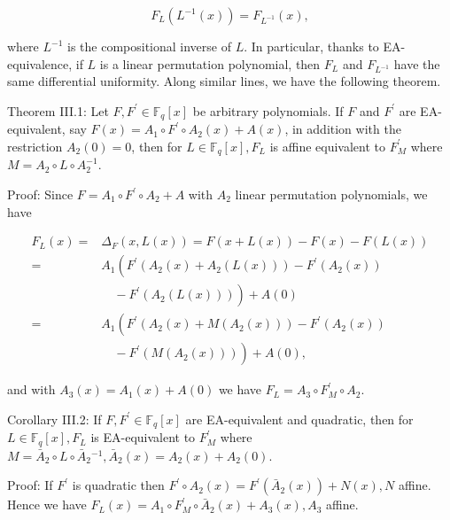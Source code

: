 \documentclass[10pt]{article}
\begin{document}
\begin{equation*}
F_{L}\left(L^{-1}(x)\right)=F_{L^{-1}}(x), \tag{3}
\end{equation*}


where $L^{-1}$ is the compositional inverse of $L$. In particular, thanks to EA-equivalence, if $L$ is a linear permutation polynomial, then $F_{L}$ and $F_{L^{-1}}$ have the same differential uniformity. Along similar lines, we have the following theorem.

Theorem III.1: Let $F, F^{\prime} \in \mathbb{F}_{q}[x]$ be arbitrary polynomials. If $F$ and $F^{\prime}$ are EA-equivalent, say $F(x)=A_{1} \circ F^{\prime} \circ A_{2}(x)+ A(x)$, in addition with the restriction $A_{2}(0)=0$, then for $L \in \mathbb{F}_{q}[x], F_{L}$ is affine equivalent to $F_{M}^{\prime}$ where $M=A_{2} \circ L \circ A_{2}^{-1}$.

Proof: Since $F=A_{1} \circ F^{\prime} \circ A_{2}+A$ with $A_{2}$ linear permutation polynomials, we have

$$
\begin{aligned}
F_{L}(x)= & \Delta_{F}(x, L(x))=F(x+L(x))-F(x)-F(L(x)) \\
= & A_{1}\left(F^{\prime}\left(A_{2}(x)+A_{2}(L(x))\right)-F^{\prime}\left(A_{2}(x)\right)\right. \\
& \left.\quad-F^{\prime}\left(A_{2}(L(x))\right)\right)+A(0) \\
= & A_{1}\left(F^{\prime}\left(A_{2}(x)+M\left(A_{2}(x)\right)\right)-F^{\prime}\left(A_{2}(x)\right)\right. \\
& \left.\quad-F^{\prime}\left(M\left(A_{2}(x)\right)\right)\right)+A(0),
\end{aligned}
$$

and with $A_{3}(x)=A_{1}(x)+A(0)$ we have $F_{L}=A_{3} \circ F_{M}^{\prime} \circ A_{2}$.

Corollary III.2: If $F, F^{\prime} \in \mathbb{F}_{q}[x]$ are EA-equivalent and quadratic, then for $L \in \mathbb{F}_{q}[x], F_{L}$ is EA-equivalent to $F_{M}^{\prime}$ where $M=\bar{A}_{2} \circ L \circ \bar{A}_{2}{ }^{-1}, \bar{A}_{2}(x)=A_{2}(x)+A_{2}(0)$.

Proof: If $F^{\prime}$ is quadratic then $F^{\prime} \circ A_{2}(x)=F^{\prime}\left(\bar{A}_{2}(x)\right)+ N(x), N$ affine. Hence we have $F_{L}(x)=A_{1} \circ F_{M}^{\prime} \circ \bar{A}_{2}(x)+ A_{3}(x), A_{3}$ affine.
\end{document}
